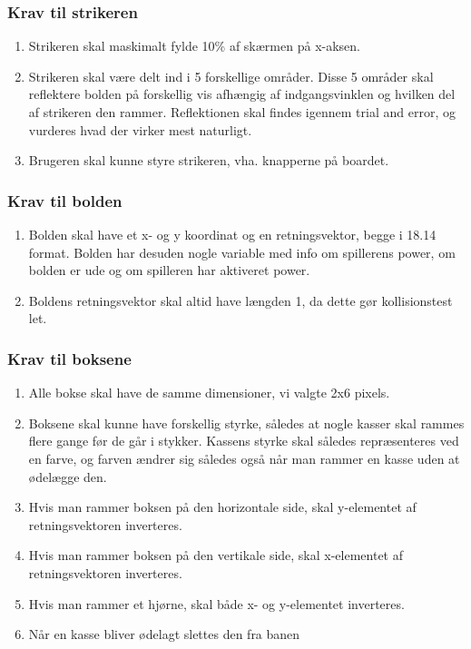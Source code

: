 \subsubsection{Krav til strikeren}
\begin{enumerate}
\item Strikeren skal maskimalt fylde 10\% af skærmen på x-aksen. 
\item  Strikeren skal være delt ind i 5 forskellige områder. Disse 5 områder skal reflektere bolden på forskellig vis afhængig af indgangsvinklen og hvilken del af strikeren den rammer. Reflektionen skal findes igennem trial and error, og vurderes hvad der virker mest naturligt.
\item Brugeren skal kunne styre strikeren, vha. knapperne på boardet.
\end{enumerate}
\subsubsection{Krav til bolden}
\label{Ballkrav}
\begin{enumerate}
\item Bolden skal have et x- og y koordinat og en retningsvektor, begge i 18.14 format. Bolden har desuden nogle variable med info om spillerens power, om bolden er ude og om spilleren har aktiveret power.
\item Boldens retningsvektor skal altid have længden 1, da dette gør kollisionstest let.

\end{enumerate}
\subsubsection{Krav til boksene}
\begin{enumerate}
\item Alle bokse skal have de samme dimensioner, vi valgte 2x6 pixels.
\item Boksene skal kunne have forskellig styrke, således at nogle kasser skal rammes flere gange før de går i stykker. Kassens styrke skal således repræsenteres ved en farve, og farven ændrer sig således også når man rammer en kasse uden at ødelægge den.
\item Hvis man rammer boksen på den horizontale side, skal y-elementet af retningsvektoren inverteres. 
\item Hvis man rammer boksen på den vertikale side, skal x-elementet af retningsvektoren inverteres.
\item Hvis man rammer et hjørne, skal både x- og y-elementet inverteres.
\item Når en kasse bliver ødelagt slettes den fra banen
\end{enumerate}



